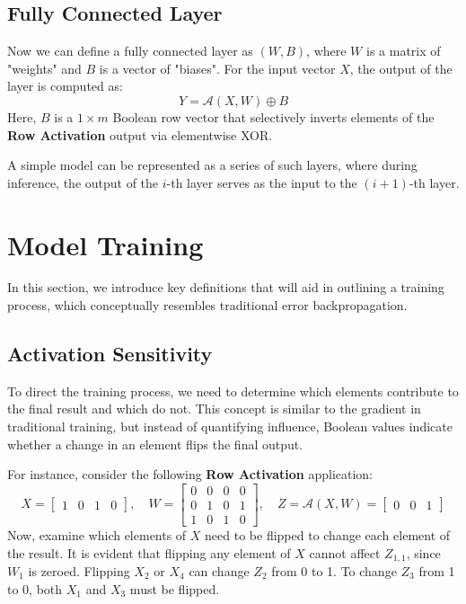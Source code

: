 \documentclass{article}
\theoremstyle{definition}
\theoremstyle{remark}
\begin{document}
\subsection{Fully Connected Layer}
Now we can define a fully connected layer as \( (W, B) \), where \( W \) is a matrix of "weights" and \( B \) is a vector of "biases". For the input vector \( X \), the output of the layer is computed as:
\[ Y = \mathcal{A}(X, W) \oplus B \]
Here, \( B \) is a \( 1 \times m \) Boolean row vector that selectively inverts elements of the \textbf{Row Activation} output via elementwise XOR.

A simple model can be represented as a series of such layers, where during inference, the output of the \( i \)-th layer serves as the input to the \( (i+1) \)-th layer.

\section{Model Training}
In this section, we introduce key definitions that will aid in outlining a training process, which conceptually resembles traditional error backpropagation.

\subsection{Activation Sensitivity}
To direct the training process, we need to determine which elements contribute to the final result and which do not. This concept is similar to the gradient in traditional training, but instead of quantifying influence, Boolean values indicate whether a change in an element flips the final output.

For instance, consider the following \textbf{Row Activation} application:
\[
    X = \begin{bmatrix} 1 & 0 & 1 & 0 \end{bmatrix}, \quad
    W = \begin{bmatrix} 0 & 0 & 0 & 0 \\ 0 & 1 & 0 & 1 \\ 1 & 0 & 1 & 0 \end{bmatrix}, \quad
    Z = \mathcal{A}(X, W) = \begin{bmatrix} 0 & 0 & 1 \end{bmatrix}
\]
Now, examine which elements of \( X \) need to be flipped to change each element of the result. It is evident that flipping any element of \( X \) cannot affect \( Z_{1,1} \), since \( W_1 \) is zeroed. Flipping \( X_2 \) or \( X_4 \) can change \( Z_2 \) from 0 to 1. To change \( Z_3 \) from 1 to 0, both \( X_1 \) and \( X_3 \) must be flipped.
\end{document}
